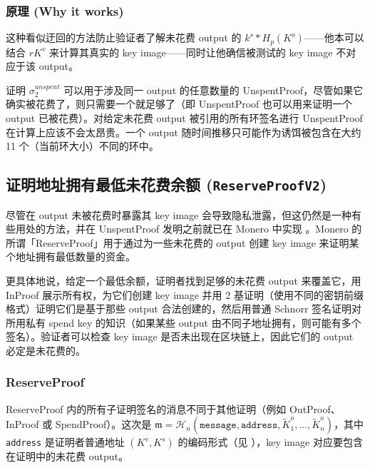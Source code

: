 \subsubsection*{原理 (Why it works)}

这种看似迂回的方法防止验证者了解未花费 output 的 $k^s*H_p(K^o)$——他本可以结合 $r K^v$ 来计算其真实的 key image——同时让他确信被测试的 key image 不对应于该 output。

证明 $\sigma^{unspent}_2$ 可以用于涉及同一 output 的任意数量的 UnspentProof，尽管如果它确实被花费了，则只需要一个就足够了（即 UnspentProof 也可以用来证明一个 output 已被花费）。对给定未花费 output 被引用的所有环签名进行 UnspentProof 在计算上应该不会太昂贵。一个 output 随时间推移只可能作为诱饵被包含在大约 11 个（当前环大小）不同的环中。


\subsection{证明地址拥有最低未花费余额 ({\tt ReserveProofV2})}
\label{subsec:proofs-minimum-balance-reserveproof}

尽管在 output 未被花费时暴露其 key image 会导致隐私泄露，但这仍然是一种有些用处的方法，并在 UnspentProof 发明之前就已在 Monero 中实现 \cite{reserveproofs-pull-request-3027} \cite{unspent-proof-issue-68}。Monero 的所谓「ReserveProof」用于通过为一些未花费的 output 创建 key image 来证明某个地址拥有最低数量的资金。

更具体地说，给定一个最低余额，证明者找到足够的未花费 output 来覆盖它，用 InProof 展示所有权，为它们创建 key image 并用 2 基证明（使用不同的密钥前缀格式）证明它们是基于那些 output 合法创建的，然后用普通 Schnorr 签名证明对所用私有 spend key 的知识（如果某些 output 由不同子地址拥有，则可能有多个签名）。验证者可以检查 key image 是否未出现在区块链上，因此它们的 output 必定是未花费的。

\subsubsection*{ReserveProof}

ReserveProof 内的所有子证明签名的消息不同于其他证明（例如 OutProof、InProof 或 SpendProof）。这次是 $\mathfrak{m} = \mathcal{H}_n(\texttt{message}, \texttt{address}, \tilde{K}^o_1, ..., \tilde{K}^o_n)$，其中 {\tt address} 是证明者普通地址 $(K^v, K^s)$ 的编码形式（见 \cite{luigi-address}），key image 对应要包含在证明中的未花费 output。

